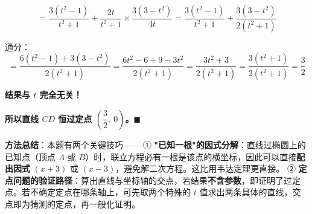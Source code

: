 \begin{answer}
\nopagebreak[4]
\[=\frac{3\left(t^{2}-1\right)}{t^{2}+1}+\frac{2t}{t^{2}+1}\times\frac{3\left(3-t^{2}\right)}{4t}=\frac{3\left(t^{2}-1\right)}{t^{2}+1}+\frac{3\left(3-t^{2}\right)}{2\left(t^{2}+1\right)}\]

通分：
\nopagebreak[4]
\[=\frac{6\left(t^{2}-1\right)+3\left(3-t^{2}\right)}{2\left(t^{2}+1\right)}=\frac{6t^{2}-6+9-3t^{2}}{2\left(t^{2}+1\right)}=\frac{3t^{2}+3}{2\left(t^{2}+1\right)}=\frac{3\left(t^{2}+1\right)}{2\left(t^{2}+1\right)}=\frac32\]

\textbf{结果与 $t$ 完全无关！}

\textbf{所以直线 $CD$ 恒过定点 $\left(\dfrac32,\ 0\right)$。$\blacksquare$}

\begin{gktip}
\textbf{方法总结}：本题有两个关键技巧——
① \textbf{"已知一根"的因式分解}：直线过椭圆上的已知点（顶点 $A$ 或 $B$）时，联立方程必有一根是该点的横坐标，因此可以直接\textbf{配出因式} $(x+3)$ 或 $(x-3)$，避免解二次方程。这比用韦达定理更直接。
② \textbf{定点问题的验证路径}：算出直线与坐标轴的交点，若结果\textbf{不含参数}，即证明了过定点。若不确定定点在哪条轴上，可先取两个特殊的 $t$ 值求出两条具体的直线，交点即为猜测的定点，再一般化证明。
\end{gktip}



\par\medskip

\end{answer}
